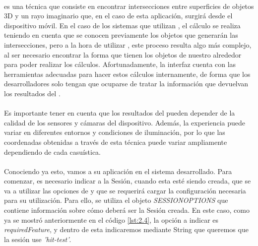 \documentclass{subfiles}
\begin{document}
        \paragraph{}
        \hittest es una técnica que consiste en encontrar intersecciones entre superficies de objetos 3D y un rayo imaginario que, en el caso de esta aplicación, surgirá desde el dispositivo móvil. En el caso de los sistemas que utilizan \rv, el cálculo se realiza teniendo en cuenta que se conocen previamente los objetos que generarán las intersecciones, pero a la hora de utilizar \ra, este proceso resulta algo más complejo, al ser necesario encontrar la forma que tienen los objetos de nuestro alrededor para poder realizar los cálculos. Afortunadamente, la interfaz \webxr cuenta con las herramientas adecuadas para hacer estos cálculos internamente, de forma que los desarrolladores solo tengan que ocuparse de tratar la información que devuelvan los resultados del \hittest.

        \paragraph{}
        Es importante tener en cuenta que los resultados del \hittest pueden depender de la calidad de los sensores y cámaras del dispositivo. Además, la experiencia puede variar en diferentes entornos y condiciones de iluminación, por lo que las coordenadas obtenidas a través de esta técnica puede variar ampliamente dependiendo de cada casuística.

        \paragraph{}
        Conociendo ya esto, vamos a su aplicación en el sistema desarrollado. Para comenzar, es necesario indicar a la Sesión, cuando esta esté siendo creada, que se va a utilizar las opciones de \hittest y que se requerirá cargar la configuración necesaria para su utilización. Para ello, se utiliza el objeto \textit{SESSIONOPTIONS} que contiene información sobre cómo deberá ser la Sesión creada. En este caso, como ya se mostró anteriormente en el código \ref{lst:2.4}, la opción a indicar es \textit{requiredFeature}, y dentro de esta indicaremos mediante String que queremos que la sesión use \textit{'hit-test'}.
\end{document}
